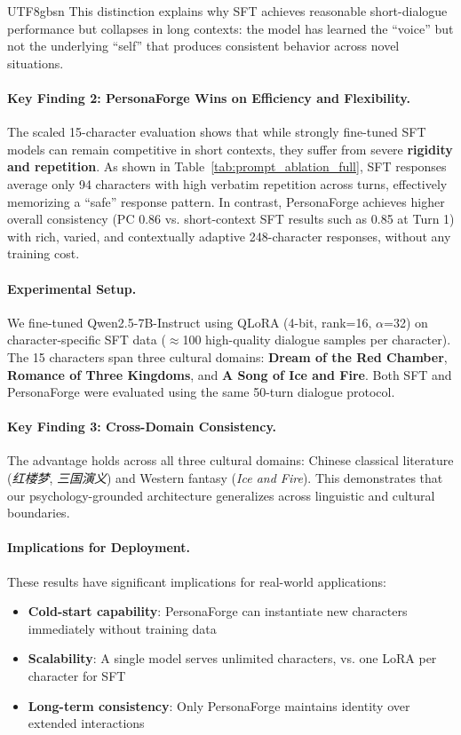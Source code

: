 \documentclass[11pt]{article}
\begin{document}
\begin{CJK*}{UTF8}{gbsn}
This distinction explains why SFT achieves reasonable short-dialogue performance but collapses in long contexts: the model has learned the ``voice'' but not the underlying ``self'' that produces consistent behavior across novel situations.

\paragraph{Key Finding 2: PersonaForge Wins on Efficiency and Flexibility.} The scaled 15-character evaluation shows that while strongly fine-tuned SFT models can remain competitive in short contexts, they suffer from severe \textbf{rigidity and repetition}. As shown in Table~\ref{tab:prompt_ablation_full}, SFT responses average only 94 characters with high verbatim repetition across turns, effectively memorizing a ``safe'' response pattern. In contrast, PersonaForge achieves higher overall consistency (PC 0.86 vs. short-context SFT results such as 0.85 at Turn 1) with rich, varied, and contextually adaptive 248-character responses, without any training cost.

\paragraph{Experimental Setup.} We fine-tuned Qwen2.5-7B-Instruct using QLoRA (4-bit, rank=16, $\alpha$=32) on character-specific SFT data ($\approx$100 high-quality dialogue samples per character). The 15 characters span three cultural domains: \textbf{Dream of the Red Chamber}, \textbf{Romance of Three Kingdoms}, and \textbf{A Song of Ice and Fire}. Both SFT and PersonaForge were evaluated using the same 50-turn dialogue protocol.

\paragraph{Key Finding 3: Cross-Domain Consistency.} The advantage holds across all three cultural domains: Chinese classical literature (\textit{红楼梦}, \textit{三国演义}) and Western fantasy (\textit{Ice and Fire}). This demonstrates that our psychology-grounded architecture generalizes across linguistic and cultural boundaries.

\paragraph{Implications for Deployment.} These results have significant implications for real-world applications:
\begin{itemize}
    \item \textbf{Cold-start capability}: PersonaForge can instantiate new characters immediately without training data
    \item \textbf{Scalability}: A single model serves unlimited characters, vs. one LoRA per character for SFT
    \item \textbf{Long-term consistency}: Only PersonaForge maintains identity over extended interactions
\end{itemize}


\end{CJK*}
\end{document}
